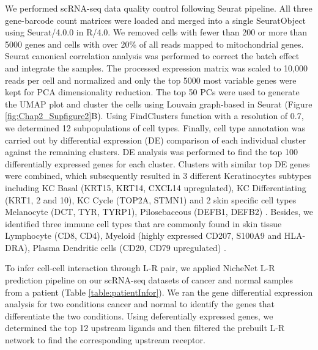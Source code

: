 We performed scRNA-seq data quality control following Seurat pipeline. All three gene-barcode count matrices were loaded and merged into a single SeuratObject using Seurat/4.0.0 in R/4.0. We removed cells with fewer than 200 or more than 5000 genes and cells with over 20\% of all reads mapped to mitochondrial genes. Seurat canonical correlation analysis was performed to correct the batch effect and integrate the samples. The processed expression matrix was scaled to 10,000 reads per cell and normalized and only the top 5000 most variable genes were kept for PCA dimensionality reduction. The top 50 PCs were used to generate the UMAP plot and cluster the cells using Louvain graph-based in Seurat (Figure \ref{fig:Chap2_Supfigure2}B). Using FindClusters function with a resolution of 0.7, we determined 12 subpopulations of cell types. Finally, cell type annotation was carried out by differential expression (DE) comparison of each individual cluster against the remaining clusters. DE analysis was performed to find the top 100 differentially expressed genes for each cluster. Clusters with similar top DE genes were combined, which subsequently resulted in 3 different Keratinocytes subtypes including KC Basal (KRT15, KRT14, CXCL14  upregulated), KC Differentiating (KRT1, 2 and 10), KC Cycle (TOP2A, STMN1)  \cite{joost2016single, ji2020multimodal} and 2 skin specific cell types Melanocyte (DCT, TYR, TYRP1), Pilosebaceous (DEFB1, DEFB2) \cite{belote2021human}. Besides, we identified three immune cell types that are commonly found in skin tissue  Lymphocyte (CD8, CD4), Myeloid (highly expressed CD207, S100A9 and HLA-DRA), Plasma Dendritic cells (CD20, CD79 upregulated) \cite{ji2020multimodal}.          

To infer cell-cell interaction through L-R pair, we applied NicheNet L-R prediction pipeline \cite{browaeys2020nichenet} on our scRNA-seq datasets of cancer and normal samples from a patient (Table \ref{table:patientInfor}). We ran the gene differential expression analysis for two conditions cancer and normal to identify the genes that differentiate the two conditions. Using deferentially expressed genes, we determined the top 12 upstream ligands and then filtered the prebuilt L-R network to find the corresponding upstream receptor.


